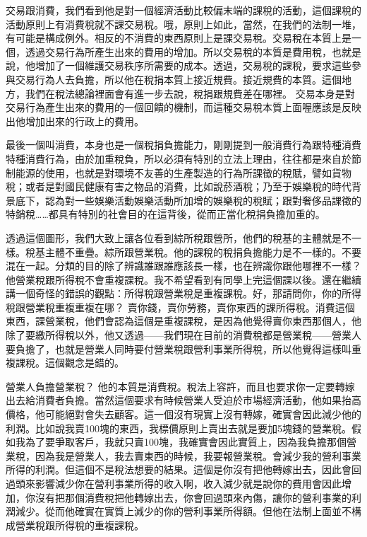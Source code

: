 \documentclass[oneside,sub3section]{ctexbook}
\begin{document}
交易跟消費，我們看到他是對一個經濟活動比較偏末端的課稅的活動，這個課稅的活動原則上有消費稅就不課交易稅。哦，原則上如此，當然，在我們的法制一堆，有可能是構成例外。相反的不消費的東西原則上是課交易稅。交易稅在本質上是一個，透過交易行為所產生出來的費用的增加。所以交易稅的本質是費用稅，也就是說，他增加了一個維護交易秩序所需要的成本。透過，交易稅的課稅，要求這些參與交易行為人去負擔，所以他在稅捐本質上接近規費。接近規費的本質。這個地方，我們在稅法總論裡面會有進一步去說，稅捐跟規費差在哪裡。
交易本身是對交易行為產生出來的費用的一個回饋的機制，而這種交易稅本質上面喔應該是反映出他增加出來的行政上的費用。

最後一個叫消費，本身也是一個稅捐負擔能力，剛剛提到一般消費行為跟特種消費特種消費行為，由於加重稅負，所以必須有特別的立法上理由，往往都是來自於節制能源的使用，也就是對環境不友善的生產製造的行為所課徵的稅賦，譬如貨物稅；或者是對國民健康有害之物品的消費，比如說菸酒稅；乃至于娛樂稅的時代背景底下，認為對一些娛樂活動娛樂活動所加增的娛樂稅的稅賦；跟對奢侈品課徵的特銷稅\ldots\ldots 都具有特別的社會目的在這背後，從而正當化稅捐負擔加重的。

透過這個圖形，我們大致上讓各位看到綜所稅跟營所，他們的稅基的主體就是不一樣。稅基主體不重疊。綜所跟營業稅。他的課稅的稅捐負擔能力是不一樣的。不要混在一起。分類的目的除了辨識誰跟誰應該長一樣，也在辨識你跟他哪裡不一樣？ 他營業稅跟所得稅不會重複課稅。我不希望看到有同學上完這個課以後。還在繼續講一個奇怪的錯誤的觀點：所得稅跟營業稅是重複課稅。好，那請問你，你的所得稅跟營業稅重複重複在哪？ 賣你錢，賣你勞務，賣你東西的課所得稅。消費這個東西，課營業稅，他們會認為這個是重複課稅，是因為他覺得賣你東西那個人，他除了要繳所得稅以外，他又透過------我們現在目前的消費稅都是營業稅------營業人要負擔了，也就是營業人同時要付營業稅跟營利事業所得稅，所以他覺得這樣叫重複課稅。這個觀念是錯的。

營業人負擔營業稅？ 他的本質是消費稅。稅法上容許，而且也要求你一定要轉嫁出去給消費者負擔。當然這個要求有時候營業人受迫於市場經濟活動，他如果抬高價格，他可能絕對會失去顧客。這一個沒有現實上沒有轉嫁，確實會因此減少他的利潤。比如說我賣100塊的東西，我標價原則上賣出去就是要加5塊錢的營業稅。假如我為了要爭取客戶，我就只賣100塊，我確實會因此實質上，因為我負擔那個營業稅，因為我是營業人，我去賣東西的時候，我要報營業稅。會減少我的營利事業所得的利潤。但這個不是稅法想要的結果。這個是你沒有把他轉嫁出去，因此會回過頭來影響減少你在營利事業所得的收入啊，收入減少就是說你的費用會因此增加，你沒有把那個消費稅把他轉嫁出去，你會回過頭來內傷，讓你的營利事業的利潤減少。從而他確實在實質上減少的你的營利事業所得額。但他在法制上面並不構成營業稅跟所得稅的重複課稅。
\end{document}
